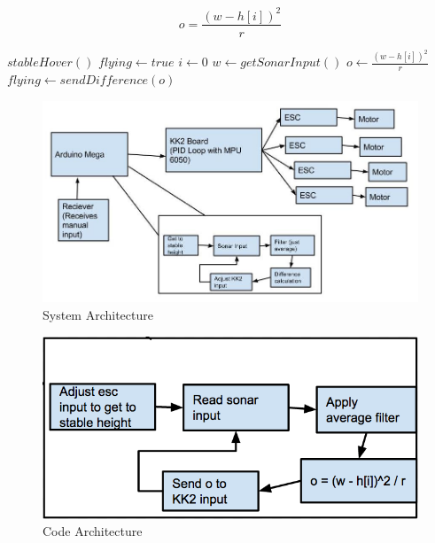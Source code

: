 \documentclass{lposter}
\theoremstyle{plain}
\theoremstyle{definition}
\begin{document}
\begin{poster}
\begin{itemize}
\begin{itemize}
$$ o = \frac{(w - h[i])^2}{r}$$

\end{itemize}

\begin{algorithmic}
\State $stableHover()$
\State $flying\gets true$
\State $i\gets 0$
\State $w \gets getSonarInput()$
\State $o \gets \frac{(w - h[i])^2}{r}$
\State $flying \gets sendDifference(o)$
\EndWhile

\EndFunction
\end{algorithmic}

\begin{figure}
\centering
\includegraphics[scale=.8]{quad_state_machine.jpg}
\caption{System Architecture\newline}
\label{fig:mig_over}
\end{figure}


\begin{figure}
\centering
\includegraphics[scale=.8]{code}
\caption{Code Architecture\newline}
\label{fig:mig_over}
\end{figure}
\end{itemize}


\end{poster}
\end{document}

